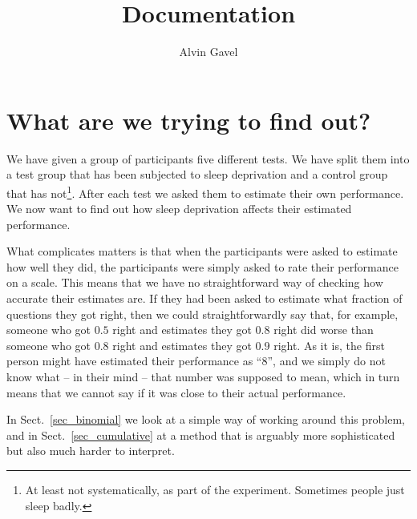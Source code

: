 \documentclass[10pt, twoside,a4paper]{article}
\title{Documentation}
\author{Alvin Gavel}
\date{}
\begin{document}
\maketitle

\tableofcontents

\newpage
\section{What are we trying to find out?}
We have given a group of participants five different tests. We have split them into a test group that has been subjected to sleep deprivation and a control group that has not\footnote{At least not systematically, as part of the experiment. Sometimes people just sleep badly.}. After each test we asked them to estimate their own performance. We now want to find out how sleep deprivation affects their estimated performance.

What complicates matters is that when the participants were asked to estimate how well they did, the participants were simply asked to rate their performance on a scale. This means that we have no straightforward way of checking how accurate their estimates are. If they had been asked to estimate what fraction of questions they got right, then we could straightforwardly say that, for example, someone who got $0.5$ right and estimates they got $0.8$ right did worse than someone who got $0.8$ right and estimates they got $0.9$ right. As it is, the first person might have estimated their performance as ``8'', and we simply do not know what -- in their mind -- that number was supposed to mean, which in turn means that we cannot say if it was close to their actual performance.

In Sect.~\ref{sec_binomial} we look at a simple way of working around this problem, and in Sect.~\ref{sec_cumulative} at a method that is arguably more sophisticated but also much harder to interpret.






\newpage
\end{document}
